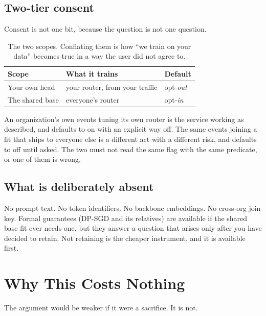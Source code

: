 \documentclass[11pt,a4paper]{article}
\begin{document}
\subsection{Two-tier consent}

Consent is not one bit, because the question is not one question.

\begin{table}[H]
\centering
\caption{The two scopes. Conflating them is how ``we train on your data'' becomes true in
a way the user did not agree to.}
\begin{tabular}{lll}
\toprule
\textbf{Scope} & \textbf{What it trains} & \textbf{Default} \\
\midrule
Your own head   & your router, from your traffic & opt-\emph{out} \\
The shared base & everyone's router              & opt-\emph{in} \\
\bottomrule
\end{tabular}
\end{table}

An organization's own events tuning its own router is the service working as described,
and defaults to on with an explicit way off. The same events joining a fit that ships to
everyone else is a different act with a different risk, and defaults to off until asked.
The two must not read the same flag with the same predicate, or one of them is wrong.

\subsection{What is deliberately absent}

No prompt text. No token identifiers. No backbone embeddings. No cross-org join key.
Formal guarantees (DP-SGD and its relatives) are available if the shared base fit ever
needs one, but they answer a question that arises only after you have decided to retain.
Not retaining is the cheaper instrument, and it is available first.

\section{Why This Costs Nothing}

The argument would be weaker if it were a sacrifice. It is not.
\end{document}
